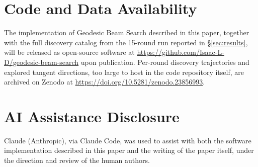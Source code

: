 \documentclass[11pt]{article}
\begin{document}
\section*{Code and Data Availability}

The implementation of Geodesic Beam Search described in this paper, together
with the full discovery catalog from the 15-round run reported in
\S\ref{sec:results}, will be released as open-source software at
\url{https://github.com/Isaac-L-D/geodesic-beam-search} upon publication.
Per-round discovery trajectories and explored tangent directions, too large
to host in the code repository itself, are archived on Zenodo at
\url{https://doi.org/10.5281/zenodo.23856993}.

\section*{AI Assistance Disclosure}

Claude (Anthropic), via Claude Code, was used to assist with both the
software implementation described in this paper and the writing of the
paper itself, under the direction and review of the human authors.



\end{document}
